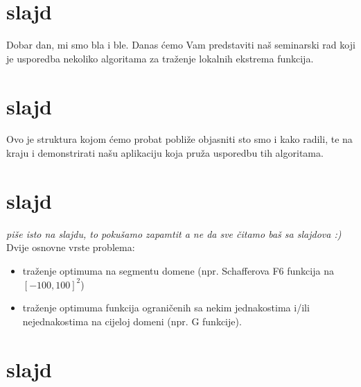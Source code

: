 \documentclass[a4paper,10pt]{article}
\title{}
\author{}
\begin{document}
\maketitle

\begin{abstract}

\end{abstract}

\section{slajd}
Dobar dan, mi smo bla i ble. Danas \' cemo Vam predstaviti na\v s seminarski rad koji je usporedba nekoliko algoritama za tra\v zenje lokalnih ekstrema funkcija.

\section{slajd}
Ovo je struktura kojom \' cemo probat pobli\v ze objasniti sto smo i kako radili, te na kraju i demonstrirati na\v su aplikaciju koja pru\v za usporedbu tih algoritama.

\section{slajd}
\emph{pi\v se isto na slajdu, to poku\v samo zapamtit a ne da sve \v citamo ba\v s sa slajdova :)}
Dvije osnovne vrste problema:
  \begin{itemize}
   \item tra\v zenje optimuma na segmentu domene (npr. Schafferova F6 funkcija na $[-100,100]^2$)
   \item tra\v zenje optimuma funkcija ograni\v cenih sa nekim jednakostima i/ili nejednakostima na cijeloj domeni (npr. G funkcije).
  \end{itemize}

\section{slajd}
\end{document}
